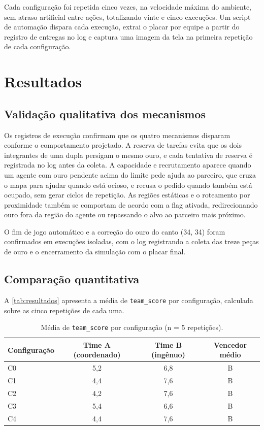 \documentclass{article}
\begin{document}
Cada configuração foi repetida cinco vezes, na velocidade máxima do
ambiente, sem atraso artificial entre ações, totalizando vinte e cinco
execuções. Um script de automação dispara cada execução, extrai o placar por
equipe a partir do registro de entregas no log e captura uma imagem da tela
na primeira repetição de cada configuração.

\section{Resultados}
\label{sec:resultados}

\subsection{Validação qualitativa dos mecanismos}

Os registros de execução confirmam que os quatro mecanismos disparam
conforme o comportamento projetado. A reserva de tarefas evita que os dois
integrantes de uma dupla persigam o mesmo ouro, e cada tentativa de reserva
é registrada no log antes da coleta. A capacidade e recrutamento aparece
quando um agente com ouro pendente acima do limite pede ajuda ao parceiro, que cruza
o mapa para ajudar quando está ocioso, e recusa o pedido quando também está
ocupado, sem gerar ciclos de repetição. As regiões estáticas e o roteamento
por proximidade também se comportam de acordo com a flag ativada,
redirecionando ouro fora da região do agente ou repassando o alvo ao
parceiro mais próximo.

O fim de jogo automático e a correção do ouro do canto (34, 34) foram
confirmados em execuções isoladas, com o log registrando a coleta das treze
peças de ouro e o encerramento da simulação com o placar final.

\subsection{Comparação quantitativa}

A \autoref{tab:resultados} apresenta a média de \texttt{team\_score} por
configuração, calculada sobre as cinco repetições de cada uma.

\begin{table}[H]
    \centering
    \caption{Média de \texttt{team\_score} por configuração (n = 5 repetições).}
    \label{tab:resultados}
    \begin{tabular}{lccc}
        \hline
        \textbf{Configuração} & \textbf{Time A (coordenado)} & \textbf{Time B (ingênuo)} & \textbf{Vencedor médio} \\
        \hline
        C0 & 5,2 & 6,8 & B \\
        C1 & 4,4 & 7,6 & B \\
        C2 & 4,2 & 7,6 & B \\
        C3 & 5,4 & 6,6 & B \\
        C4 & 4,4 & 7,6 & B \\
        \hline
    \end{tabular}
\end{table}
\end{document}
